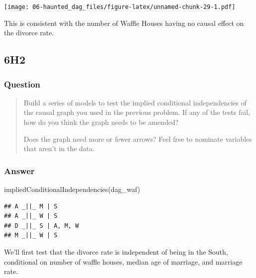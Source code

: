 \documentclass[
]{book}
\newenvironment{Shaded}{\begin{snugshade}}{\end{snugshade}}
\newcommand{\FunctionTok}[1]{\textcolor[rgb]{0.00,0.00,0.00}{#1}}
\newcommand{\NormalTok}[1]{#1}
\begin{document}
\texttt{[image: 06-haunted\_dag\_files/figure-latex/unnamed-chunk-29-1.pdf]}

This is consistent with the number of Waffle Houses having no causal effect on the divorce rate.

\hypertarget{h2-2}{%
\subsection*{6H2}\label{h2-2}}

\hypertarget{question-56}{%
\subsubsection*{Question}\label{question-56}}

\begin{quote}
Build a series of models to test the implied conditional independencies of the causal graph you used in the previous problem. If any of the tests fail, how do you think the graph needs to be amended?

Does the graph need more or fewer arrows? Feel free to nominate variables that aren't in the data.
\end{quote}

\hypertarget{answer-56}{%
\subsubsection*{Answer}\label{answer-56}}

\begin{Shaded}
\begin{Highlighting}[]
\FunctionTok{impliedConditionalIndependencies}\NormalTok{(dag\_waf)}
\end{Highlighting}
\end{Shaded}

\begin{verbatim}
## A _||_ M | S
## A _||_ W | S
## D _||_ S | A, M, W
## M _||_ W | S
\end{verbatim}

We'll first test that the divorce rate is independent of being in the South, conditional on number of waffle houses, median age of marriage, and marriage rate.
\end{document}
